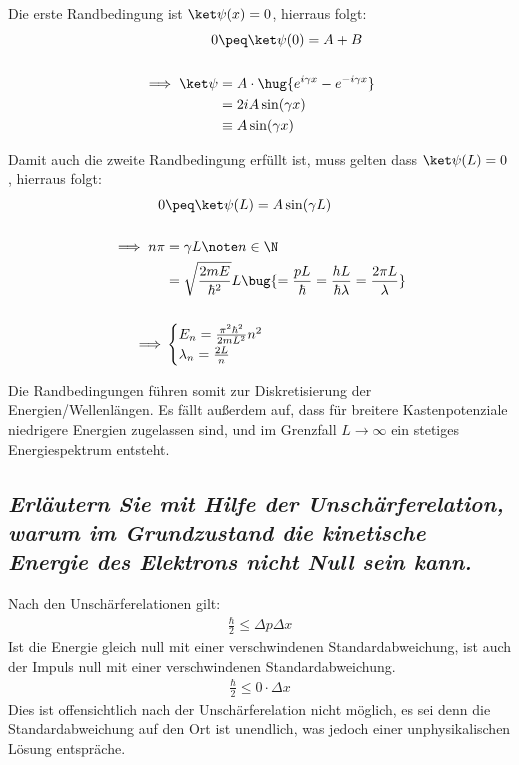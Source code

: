 \documentclass[ex, minted]{exercise_4.0}
\begin{document}
Die erste Randbedingung ist $\ket\psi (x) = 0$, hierraus folgt:
\begin{align*}
    0 &\peq \ket \psi(0) = A + B\\\\
    \implies \ket \psi &= A \cdot\hug{ e^{i \gamma x} - e^{- i \gamma x}}\\
    &= 2i A \sin(\gamma x) \\
    &\equiv A\sin(\gamma x)
\end{align*} 

Damit auch die zweite Randbedingung erfüllt ist, muss gelten dass $\ket\psi (L) = 0$, hierraus folgt:
\begin{align*}
    0 &\peq \ket \psi(L) 
    = A\sin(\gamma L)\\\\
    \implies n\pi &= \gamma L\note n\in\N\\
    &= \sqrt{\frac{2m E}{\hbar^2}} L 
    \bug{= \frac{pL}{\hbar}  
    = \frac{h L}{\hbar \lambda}  
    = \frac{2\pi L}{\lambda}}  \\
    \\
    \implies &\begin{cases}
        E_n = \frac{\pi^2\hbar^2}{2m L^2} n^2\\
        \lambda_n = \frac{2L}{n}
    \end{cases}
\end{align*} 

Die Randbedingungen führen somit zur Diskretisierung der Energien/Wellenlängen. Es  fällt außerdem auf, dass für breitere Kastenpotenziale niedrigere Energien zugelassen sind, und im Grenzfall $L\to \infty$ ein stetiges Energiespektrum entsteht.

\subsection{\it Erläutern Sie mit Hilfe der Unschärferelation, warum im Grundzustand die kinetische Energie des Elektrons nicht Null sein kann.}\vspace{1ex}

Nach den Unschärferelationen gilt:
\begin{align*}
    \frac \hbar 2 \le \Delta p \Delta x
\end{align*}
Ist die Energie gleich null mit einer verschwindenen Standardabweichung, ist auch der Impuls null mit einer verschwindenen Standardabweichung.
\begin{align*}
    \frac \hbar 2 \le 0\cdot  \Delta x
\end{align*}
Dies ist offensichtlich nach der Unschärferelation nicht möglich, es sei denn die Standardabweichung auf den Ort ist unendlich, was jedoch einer unphysikalischen Lösung entspräche. 
\end{document}
